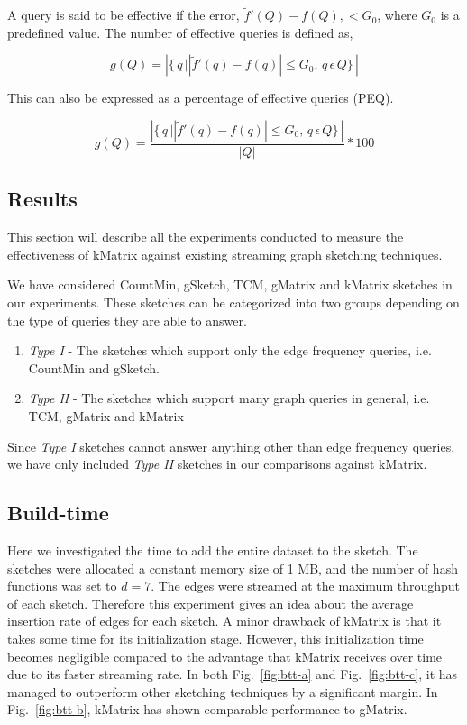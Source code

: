 A query is said to be effective if the error, $\tilde{f}'(Q) - f(Q), < G_0$,  where $G_0$ is a predefined value. The number of effective queries is defined as,

\begin{equation}
    g(Q) =  \left | \{\,q\, |   \left |\tilde{f}'(q) - f(q)\right | \leq G_0, \,q \, \epsilon  \,Q\} \, \right|
\end{equation}

This can also be expressed as a percentage of effective queries (PEQ).

\begin{equation}
    g(Q) =  \frac{\left | \{\,q\, |   \left |\tilde{f}'(q) - f(q)\right | \leq G_0, \,q \, \epsilon  \,Q\} \, \right|}{|Q|}*100
\end{equation}

\subsection{Results}

This section will describe all the experiments conducted to measure the effectiveness of kMatrix against existing streaming graph sketching techniques. 

We have considered CountMin, gSketch, TCM, gMatrix and kMatrix sketches in our experiments. These sketches can be categorized into two groups depending on the type of queries they are able to answer.

\begin{enumerate}
    \item \emph{Type I} - The sketches which support only the edge frequency queries, i.e. CountMin and gSketch.
    \item \emph{Type II} - The sketches which support many graph queries in general, i.e. TCM, gMatrix and kMatrix
\end{enumerate}

Since \emph{Type I} sketches cannot answer anything other than edge frequency queries, we have only included \emph{Type II} sketches in our comparisons against kMatrix.

\subsection{Build-time}

Here we investigated the time to add the entire dataset to the sketch. The sketches were allocated a constant memory size of 1 MB, and the number of hash functions was set to \(d = 7\). The edges were streamed at the maximum throughput of each sketch. Therefore this experiment gives an idea about the average insertion rate of edges for each sketch. A minor drawback of kMatrix is that it takes some time for its initialization stage. However, this initialization time becomes negligible compared to the advantage that kMatrix receives over time due to its faster streaming rate. In both Fig.~\ref{fig:btt-a} and Fig.~\ref{fig:btt-c}, it has managed to outperform other sketching techniques by a significant margin. In Fig.~\ref{fig:btt-b}, kMatrix has shown comparable performance to gMatrix.

